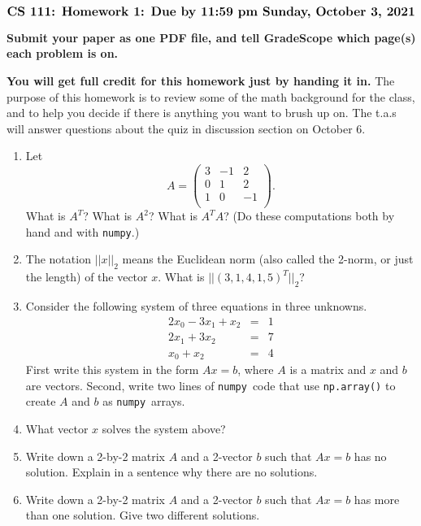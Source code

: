 \documentclass[11pt]{article}
\newcommand{\numpy}{{\tt numpy}}            %
\begin{document}
$$\mbox{\Large \bf CS 111: Homework 1: Due by 11:59 pm Sunday, October 3, 2021}$$
\par\smallskip\noindent
{\bf Submit your paper as one PDF file,
and tell GradeScope which page(s) each problem is on.}

\par\medskip\noindent
{\bf You will get full credit for this homework just by handing it in.}
The purpose of this homework is to review some of the math background
for the class, and to help you decide if there is anything you want to 
brush up on.  The t.a.s will answer questions about the quiz in discussion 
section on October 6.


\begin{enumerate}

\item
Let
$$ A = \left(
\begin{array}{ccc}
3 & -1 & 2 \\ 	
0 & 1 & 2 \\ 
1 & 0 & -1 \\
\end{array} 
\right). $$
What is $A^T$?  What is $A^2$?  What is $A^TA$?
(Do these computations both by hand and with \numpy.)

\item
The notation $||x||_2$ means the Euclidean norm (also called the 2-norm,
or just the length) of the vector $x$.  
What is $||(3, 1, 4, 1, 5)^T||_2$?

\item
Consider the following system of three equations in three unknowns.
\begin{eqnarray}
 2x_0 - 3x_1 + x_2  & =  & 1 \\
 2x_1 + 3x_2  & =  & 7 \\
 x_0 + x_2  & = & 4 
\end{eqnarray}
First write this system in the form $Ax=b$, 
where $A$ is a matrix and $x$ and $b$ are vectors. 
Second, write two lines of \numpy\ code that use {\tt np.array()} to
create $A$ and $b$ as \numpy\ arrays.

\item
What vector $x$ solves the system above? 

\item
Write down a 2-by-2 matrix $A$ and a 2-vector $b$ such that $Ax=b$ has no 
solution.  Explain in a sentence why there are no solutions.

\item
Write down a 2-by-2 matrix $A$ and a 2-vector $b$ such that $Ax=b$ has 
more than one solution.  Give two different solutions.


\end{enumerate}
\end{document}
